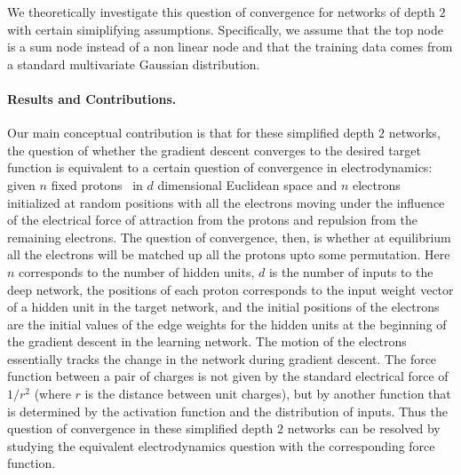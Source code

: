We theoretically investigate this question of convergence for networks of depth $2$ with certain simiplifying assumptions. Specifically, we assume that the top node is a sum node instead of a non linear node and that the training data comes from a standard multivariate Gaussian distribution. 



\paragraph{Results and Contributions.} Our main conceptual contribution is that for these simplified depth $2$ networks, the question of whether the gradient descent converges to the desired target function is equivalent to a certain question of convergence in electrodynamics: given $n$ fixed protons~ in $d$ dimensional Euclidean space and $n$ electrons initialized at random positions with all the electrons moving under the influence of the electrical force of attraction from the protons and repulsion from the remaining electrons. The question of convergence, then, is whether at equilibrium all the electrons will be matched up all the protons upto some permutation. Here $n$ corresponds to the number of hidden units, $d$ is the number of inputs to the deep network, the positions of each proton corresponds to the input weight vector of
a hidden unit in the target network, and the initial positions of the electrons are the initial values of the edge weights for the hidden units at the beginning of the gradient descent in the learning network. The motion of the electrons essentially tracks the change in the network during gradient descent. The force function between a pair of charges is not given by the standard electrical force of $1/r^2$ (where $r$ is the distance between unit charges), but by another function that is determined by the activation function and the distribution of inputs. Thus the question of convergence in these simplified depth $2$ networks can be resolved by studying the equivalent electrodynamics question with the corresponding force function.
%
